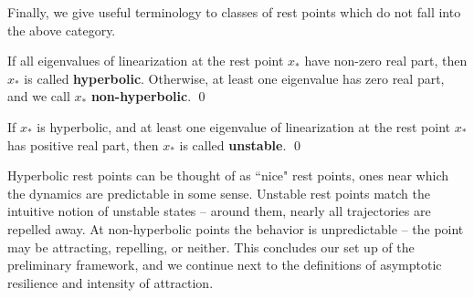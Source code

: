 Finally, we give useful terminology to classes of rest points which do not fall into the above category. 

\begin{definition}
	If all eigenvalues of linearization at the rest point $x_{\ast}$ have non-zero real part, then $x_{\ast}$ is called \textbf{hyperbolic}. Otherwise, at least one eigenvalue has zero real part, and we call $x_{\ast}$ \textbf{non-hyperbolic}.
	\qed
\end{definition}

\begin{definition}
	If $x_{\ast}$ is hyperbolic, and at least one eigenvalue of linearization at the rest point $x_{\ast}$ has positive real part, then $x_{\ast}$ is called \textbf{unstable}. 
	\qed
\end{definition}

Hyperbolic rest points can be thought of as ``nice" rest points, ones near which the dynamics are predictable in some sense. Unstable rest points match the intuitive notion of unstable states -- around them, nearly all trajectories are repelled away. At non-hyperbolic points the behavior is unpredictable -- the point may be attracting, repelling, or neither. This concludes our set up of the preliminary framework, and we continue next to the definitions of asymptotic resilience and intensity of attraction.



%


